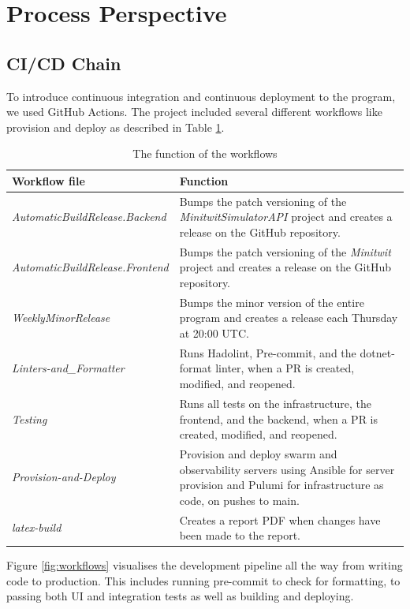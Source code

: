 \section{Process Perspective}

\subsection{CI/CD Chain}

To introduce continuous integration and continuous deployment to the program, we used GitHub Actions. The project included several different workflows like provision and deploy as described in Table \ref{tab:workflows}.

\begin{table}[H]
    \centering
    \begin{tabular}{|p{} | p{}|}
        \hline
        \textbf{Workflow file} & \textbf{Function}\\
        \hline
        \textit{AutomaticBuildRelease.Backend} &  Bumps the patch versioning of the \textit{MinitwitSimulatorAPI} project and creates a release on the GitHub repository.\\
        \textit{AutomaticBuildRelease.Frontend} & Bumps the patch versioning of the \textit{Minitwit} project and creates a release on the GitHub repository.\\
        \textit{WeeklyMinorRelease} & Bumps the minor version of the entire program and creates a release each Thursday at 20:00 UTC.\\
        \textit{Linters-and\_Formatter} & Runs Hadolint, Pre-commit, and the dotnet-format linter, when a PR is created, modified, and reopened.\\
        \textit{Testing} & Runs all tests on the infrastructure, the frontend, and the backend, when a PR is created, modified, and reopened.\\
        \textit{Provision-and-Deploy} & Provision and deploy swarm and observability servers using Ansible for server provision and Pulumi for infrastructure as code, on pushes to main.\\
        \textit{latex-build} & Creates a report PDF when changes have been made to the report.\\
        \hline
    \end{tabular}
    \caption{The function of the workflows}
    \label{tab:workflows}
\end{table}

Figure \ref{fig:workflows} visualises the development pipeline all the way from writing code to production. This includes running pre-commit to check for formatting, to passing both UI and integration tests as well as building and deploying.

